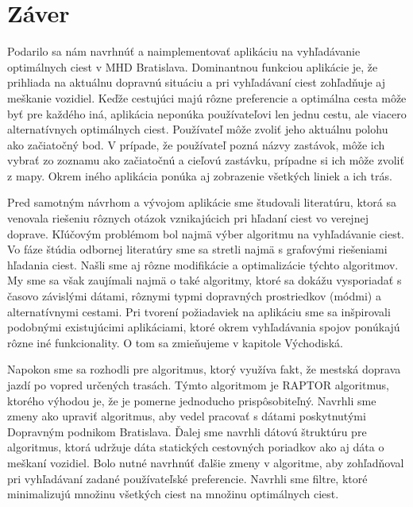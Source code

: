 \chapter*{Záver}  %

Podarilo sa nám navrhnúť a naimplementovať aplikáciu na vyhľadávanie optimálnych ciest v MHD Bratislava. Dominantnou funkciou aplikácie je, že prihliada na aktuálnu dopravnú situáciu a pri vyhľadávaní ciest zohľadňuje aj meškanie vozidiel. Keďže cestujúci majú rôzne preferencie a optimálna cesta môže byť pre každého iná, aplikácia neponúka používateľovi len jednu cestu, ale viacero alternatívnych optimálnych ciest. Používateľ môže zvoliť jeho aktuálnu polohu ako začiatočný bod. V prípade, že používateľ pozná názvy zastávok, môže ich vybrať zo zoznamu ako začiatočnú a cieľovú zastávku, prípadne si ich môže zvoliť z mapy. Okrem iného aplikácia ponúka aj zobrazenie všetkých liniek a ich trás. 

Pred samotným návrhom a vývojom aplikácie sme študovali literatúru, ktorá sa venovala riešeniu rôznych otázok vznikajúcich pri hľadaní ciest vo verejnej doprave. Kľúčovým problémom bol najmä výber algoritmu na vyhľadávanie ciest. Vo fáze štúdia odbornej literatúry sme sa stretli najmä s grafovými riešeniami hľadania ciest. Našli sme aj rôzne modifikácie a optimalizácie týchto algoritmov. My sme sa však zaujímali najmä o také algoritmy, ktoré sa dokážu vysporiadať s časovo závislými dátami, rôznymi typmi dopravných prostriedkov (módmi) a alternatívnymi cestami. Pri tvorení požiadaviek na aplikáciu sme sa inšpirovali podobnými existujúcimi aplikáciami, ktoré okrem vyhľadávania spojov ponúkajú rôzne iné funkcionality. O tom sa zmieňujeme v kapitole Východiská.

Napokon sme sa rozhodli pre algoritmus, ktorý využíva fakt, že mestská doprava jazdí po vopred určených trasách. Týmto algoritmom je RAPTOR algoritmus, ktorého výhodou je, že je pomerne jednoducho prispôsobiteľný. Navrhli sme zmeny ako upraviť algoritmus, aby vedel pracovať s dátami poskytnutými Dopravným podnikom Bratislava. Ďalej sme navrhli dátovú štruktúru pre algoritmus, ktorá udržuje dáta statických cestovných poriadkov ako aj dáta o meškaní vozidiel. Bolo nutné navrhnúť ďalšie zmeny v algoritme, aby zohľadňoval pri vyhľadávaní zadané používateľské preferencie. Navrhli sme filtre, ktoré minimalizujú množinu všetkých ciest na množinu optimálnych ciest. 

